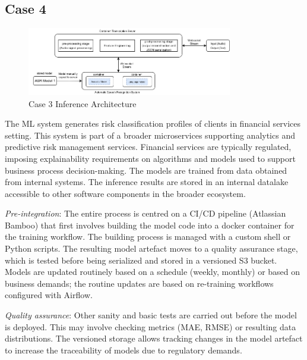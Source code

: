 \subsection*{Case 4} %
\label{case: 4}

\begin{figure}[t]
\centering
\includegraphics[width=0.8\textwidth]{images/case3_deployment_process_v2.png}
\caption{Case 3 Inference Architecture}
\label{fig: case3_deployment_process}
\end{figure}

The ML system generates risk classification profiles of clients in financial services setting. This system is part of a broader microservices supporting analytics and predictive risk management services. Financial services are typically regulated, imposing explainability requirements on algorithms and models used to support business process decision-making. The models are trained from data obtained from internal systems. The inference results are stored in an internal datalake accessible to other software components in the broader ecosystem. 

\textit{Pre-integration}: The entire process is centred on a CI/CD pipeline (Atlassian Bamboo) that first involves building the model code into a docker container for the training workflow. The building process is managed with a custom shell or Python scripts. The resulting model artefact moves to a quality assurance stage, which is tested before being serialized and stored in a versioned S3 bucket. Models are updated routinely based on a schedule (weekly, monthly) or based on business demands; the routine updates are based on re-training workflows configured with Airflow.

\textit{Quality assurance}: Other sanity and basic tests are carried out before the model is deployed. This may involve checking metrics (MAE, RMSE) or resulting data distributions.
The versioned storage allows tracking changes in the model artefact to increase the traceability of models due to regulatory demands. 

